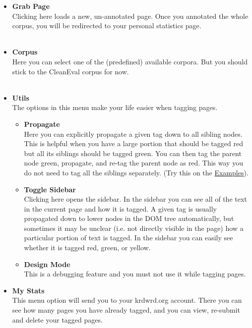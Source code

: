 \documentclass[12pt]{article}
\begin{document}
\begin{itemize}
	\item {\large \textbf{Grab Page}}\\
Clicking here loads a new, un-annotated page. Once you annotated the whole corpus, you will be redirected to your personal statistics page. \\ \\
	\item {\large \textbf{Corpus}}\\
Here you can select one of the (predefined) available corpora. But you should stick to the CleanEval corpus for now.\\ \\
	\item {\large \textbf{Utils}}\\
The options in this menu make your life easier when tagging pages. \\
	\begin{itemize}
		\item {\large \textbf{Propagate}}\\
Here you can explicitly propagate a given tag down to all sibling nodes. This is helpful when you have a large portion that should be tagged red but all its siblings should be tagged green. You can then tag the parent node green, propagate, and re-tag the parent node as red. This way you do not need to tag all the siblings separately. (Try this on the \hyperref{Examples}{Examples, described on page~}{}{Examples}).
		\item {\large \textbf{Toggle Sidebar}}\\
Clicking here opens the sidebar. In the sidebar you can see all of the text in the current page and how it is tagged. A given tag is usually propagated down to lower nodes in the DOM tree automatically, but sometimes it may be unclear (i.e. not directly visible in the page) how a particular portion of text is tagged. In the sidebar you can easily see whether it is tagged red, green, or yellow.
		\item {\large \textbf{Design Mode}}\\
This is a debugging feature and you must not use it while tagging pages. \\
	\end{itemize}
	\item {\large \textbf{My Stats}}\\
This menu option will send you to your krdwrd.org account. There you can see how many pages you have already tagged, and you can view, re-submit and delete your tagged pages. 
\end {itemize}
\end{document}
